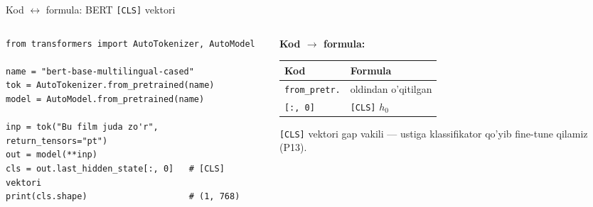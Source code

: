 \documentclass[aspectratio=169,11pt]{beamer}
\begin{document}
\begin{frame}[fragile]{Kod $\leftrightarrow$ formula: BERT \texttt{[CLS]} vektori}
  \begin{columns}[T]
    \begin{column}{0.58\textwidth}
\begin{lstlisting}
from transformers import AutoTokenizer, AutoModel

name = "bert-base-multilingual-cased"
tok = AutoTokenizer.from_pretrained(name)
model = AutoModel.from_pretrained(name)

inp = tok("Bu film juda zo'r", return_tensors="pt")
out = model(**inp)
cls = out.last_hidden_state[:, 0]   # [CLS] vektori
print(cls.shape)                    # (1, 768)
\end{lstlisting}
    \end{column}
    \begin{column}{0.38\textwidth}
      \textbf{Kod $\to$ formula:}\\[3pt]
      \footnotesize
      \begin{tabular}{p{1.9cm}p{1.9cm}}
        \toprule
        Kod & Formula \\
        \midrule
        \texttt{from\_pretr.} & oldindan o'qitilgan \\
        \texttt{[:, 0]} & \texttt{[CLS]} $h_0$ \\
        \bottomrule
      \end{tabular}
      \vspace{4pt}
      \begin{tcolorbox}[okbox,top=2pt,bottom=2pt]
        \footnotesize
        \texttt{[CLS]} vektori gap vakili --- ustiga klassifikator qo'yib
        fine-tune qilamiz (P13).
      \end{tcolorbox}
    \end{column}
  \end{columns}
\end{frame}
\end{document}
